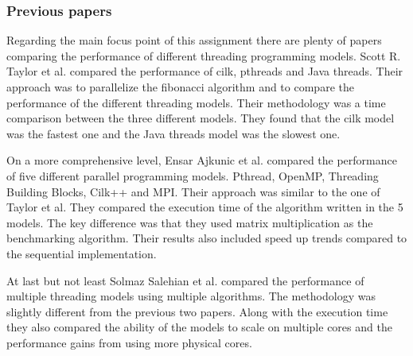 \subsubsection*{Previous papers}

Regarding the main focus point of this assignment there are plenty of papers comparing the performance of different threading programming
models. Scott R. Taylor et al. \cite{multithreading-comparison} compared the performance of cilk, pthreads and Java threads. Their approach
was to parallelize the fibonacci algorithm and to compare the performance of the different threading models. Their methodology was a time
comparison between the three different models. They found that the cilk model was the fastest one and the Java threads model was the slowest one.

On a more comprehensive level, Ensar Ajkunic et al. \cite{5-parallel-models} compared the performance of five different parallel programming models.
Pthread, OpenMP, Threading Building Blocks, Cilk++ and MPI. Their approach was similar to the one of Taylor et al. \cite{multithreading-comparison}
They compared the execution time of the algorithm written in the 5 models. The key difference was that they used matrix multiplication as the 
benchmarking algorithm. Their results also included speed up trends compared to the sequential implementation. 

At last but not least Solmaz Salehian et al. \cite{threading-models} compared the performance of multiple threading models using multiple algorithms.
The methodology was slightly different from the previous two papers. Along with the execution time they also compared the ability of the models to
scale on multiple cores and the performance gains from using more physical cores.